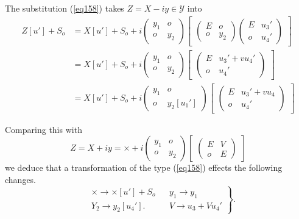 The substitution (\ref{eq158}) takes $Z = X - i y \in \mathscr{Y}$ into  
\begin{align*}
Z[ u' ] + S_o &=X [ u' ] + S_o + i \begin{pmatrix} y_1 & o \\ o
  & y_2 \end{pmatrix} \begin{bmatrix}\begin{pmatrix} E & o \\ o &
    y_2 \end{pmatrix} \begin{pmatrix} E & u_3{'} \\ o &
    u_4{'} \end{pmatrix}\end{bmatrix} \\ 
&= X [ u' ] + S_o + i \begin{pmatrix} y_1 & o \\ o &
  y_2 \end{pmatrix} \begin{bmatrix} \begin{pmatrix} E & u_3{'} + v
    u_4{'}\\ o & u_4{'} \end{pmatrix}\end{bmatrix} \\ 
&= X[ u' ] + S_o + i \begin{pmatrix} y_1 & o \\ o & y_2 [
    u_1{'}] \end{pmatrix} \begin{bmatrix} \begin{pmatrix} E & u_3{'} +
    v u_4 \\ o & u_4{'} \end{pmatrix}\end{bmatrix} 
\end{align*} 

Comparing this with 
$$
Z = X + i y = \times + i \begin{pmatrix} y_1 & o \\ o &
  y_2 \end{pmatrix}  \begin{bmatrix} \begin{pmatrix} E & V \\ o &
    E \end{pmatrix} \end{bmatrix} 
$$
we deduce that a transformation of the type (\ref{eq158}) effects the
following changes. 
\begin{equation*}
\left.
\begin{aligned}
&\times \rightarrow \times [ u' ] + S_o && y_1 \rightarrow y_1\\
&Y_2 \rightarrow y_2 [u_4{'} ] . &&V \rightarrow u_3 + V u_4{'} 
\end{aligned}
\right \} . \tag{163}\label{eq163}
\end{equation*}

